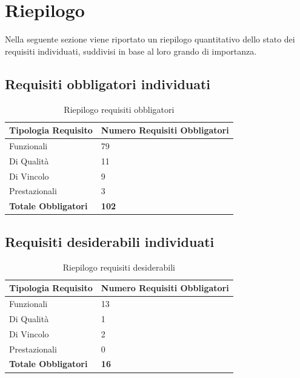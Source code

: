 \section{Riepilogo}
Nella seguente sezione viene riportato un riepilogo quantitativo dello stato dei requisiti individuati, suddivisi in base al loro grando di importanza.

\subsection{Requisiti obbligatori individuati}
\begin{table}[htbp]
	\centering
	\caption{Riepilogo requisiti obbligatori}
	\label{tab:riepilogo-obbligatori}
	\renewcommand{\arraystretch}{1.3}
	\small
	\begin{tabularx}{0.8\textwidth}{|p{4.5cm}|X|}
		\hline
		\rowcolor[gray]{0.88}
		\textbf{Tipologia Requisito} & \textbf{Numero Requisiti Obbligatori} \\
		\hline
		Funzionali & 79 \\ \hline
		Di Qualit\`a & 11 \\ \hline
		Di Vincolo & 9 \\ \hline
		Prestazionali & 3 \\ \hline
		\textbf{Totale Obbligatori} & \textbf{102} \\ \hline
	\end{tabularx}
\end{table}

\subsection{Requisiti desiderabili individuati}
\begin{table}[htbp]
	\centering
	\caption{Riepilogo requisiti desiderabili}
	\label{tab:riepilogo-desiderabili}
	\renewcommand{\arraystretch}{1.3}
	\small
	\begin{tabularx}{0.8\textwidth}{|p{4.5cm}|X|}
		\hline
		\rowcolor[gray]{0.88}
		\textbf{Tipologia Requisito} & \textbf{Numero Requisiti Obbligatori} \\
		\hline
		Funzionali & 13 \\ \hline
		Di Qualit\`a & 1 \\ \hline
		Di Vincolo & 2 \\ \hline
		Prestazionali & 0 \\ \hline
		\textbf{Totale Obbligatori} & \textbf{16} \\ \hline
	\end{tabularx}
\end{table}

